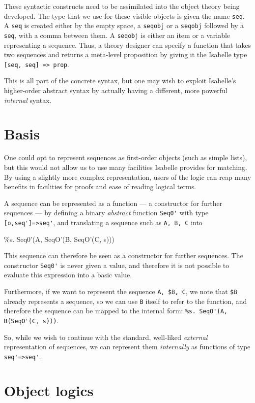 These syntactic constructs need to be assimilated into the object
theory being developed. The type that we use for these visible objects
is given the name {\tt seq}.
A {\tt seq} is created either by the empty space, a {\tt seqobj} or a
{\tt seqobj} followed by a {\tt seq}, with a comma between them. A
{\tt seqobj} is either an item or a variable representing a
sequence. Thus, a theory designer can specify a function that takes
two sequences and returns a meta-level proposition by giving it the
Isabelle type \verb|[seq, seq] => prop|.

This is all part of the concrete syntax, but one may wish to
exploit Isabelle's higher-order abstract syntax by actually having a
different, more powerful {\em internal} syntax.



\section{ Basis}

One could opt to represent sequences as first-order objects (such as
simple lists), but this would not allow us to use many facilities
Isabelle provides for matching.  By using a slightly more complex
representation, users of the logic can reap many benefits in
facilities for proofs and ease of reading logical terms.

A sequence can be represented as a function --- a constructor for
further sequences --- by defining a binary {\em abstract} function
\verb|Seq0'| with type \verb|[o,seq']=>seq'|, and translating a
sequence such as \verb|A, B, C| into
\begin{ttbox}
\%s. Seq0'(A, SeqO'(B, SeqO'(C, s)))  
\end{ttbox}
This sequence can therefore be seen as a constructor 
for further sequences. The constructor \verb|Seq0'| is never given a
value, and therefore it is not possible to evaluate this expression
into a basic value.

Furthermore, if we want to represent the sequence \verb|A, $B, C|,
we note that \verb|$B| already represents a sequence, so we can use
\verb|B| itself to refer to the function, and therefore the sequence
can be mapped to the internal form:
\verb|%s. SeqO'(A, B(SeqO'(C, s)))|.

So, while we wish to continue with the standard, well-liked {\em
external} representation of sequences, we can represent them {\em
internally} as functions of type \verb|seq'=>seq'|.


\section{Object logics}


